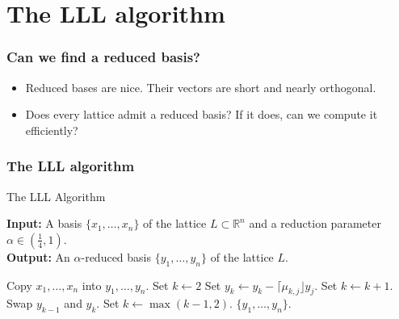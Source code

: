 \documentclass{beamer}
\newcommand{\reals}{\mathbb{R}}
\begin{document}
\section{The LLL algorithm}
\begin{frame}
	\frametitle{Can we find a reduced basis?}
	\begin{itemize}
		\item Reduced bases are nice. Their vectors are short and nearly orthogonal.\pause
		\item Does every lattice admit a reduced basis? If it does, can we compute it efficiently?
	\end{itemize}
\end{frame}

\begin{frame}
	\frametitle{The LLL algorithm}
	\begin{algorithm}[H]
	\caption{The LLL Algorithm}
	\textbf{Input: }A basis $\{x_1, \ldots, x_n\}$ of the lattice $L\subset \reals^n$ and a reduction parameter $\alpha\in (\frac{1}{4}, 1)$.\\
	\textbf{Output: }An $\alpha$-reduced basis $\{y_1, \ldots, y_n\}$ of the lattice $L$.
	\begin{algorithmic}[1]
		\State Copy $x_1, \ldots, x_n$ into $y_1, \ldots, y_n$.
		\State Set $k\gets 2$
				\State Set $y_k \gets y_k - \lceil \mu_{k,j}\rfloor y_j$.
			\EndFor
				\State Set $k \gets k+1$.
			\Else
				\State Swap $y_{k-1}$ and $y_k$.
				\State Set $k \gets \max(k-1, 2)$.
			\EndIf
		\EndWhile
		\Return $\{y_1, \ldots, y_n\}$.
	\end{algorithmic}
	\end{algorithm}
\end{frame}
\end{document}
